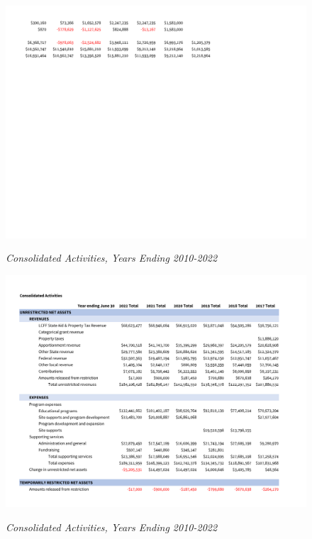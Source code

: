 \begin{figure}[hbt]
    \caption[Consolidated Activities, Years Ending 2010–2022]{\textit{Consolidated Activities, Years Ending 2010-2022}}\label{fig:consolidated_activities_2010-2022-4} %
    \includegraphics[width=\textwidth]{Consolidated_Financial_Statements/v5_Spreadsheets/Consolidated_Activities_Years_2010-2022_PDF_pages/.pg_0004}\\ %
\end{figure}
\begin{figure}[hbt]
    \caption[Consolidated Financial Position, Years Ending 2010–2022]{\textit{Consolidated Activities, Years Ending 2010-2022}}\label{fig:consolidated_activities_2010-2022-1} %
    \includegraphics[width=\textwidth]{Consolidated_Financial_Statements/v5_Spreadsheets/Consolidated_Activities_Years_2010-2022_PDF_pages/.pg_0001}\\ %
\end{figure}
